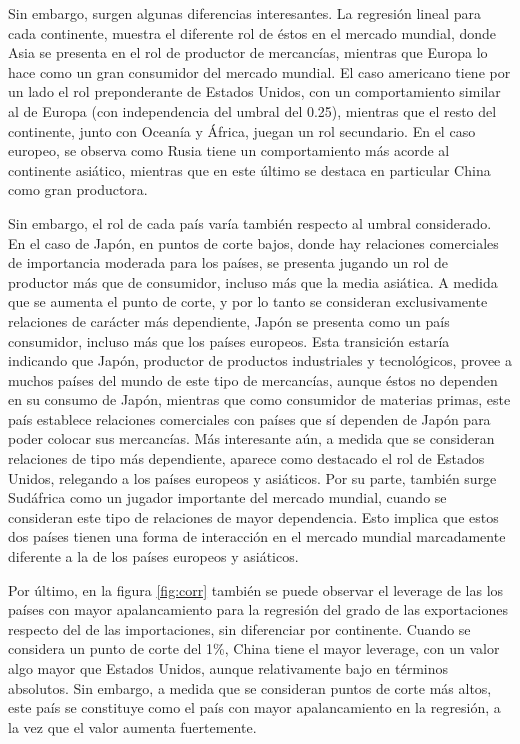 \documentclass[class=article, crop=false]{standalone}
\begin{document}
Sin embargo, surgen algunas diferencias interesantes. La regresión lineal para cada continente, muestra el diferente rol de éstos en el mercado mundial, donde Asia se presenta en el rol de productor de mercancías, mientras que Europa lo hace como un gran consumidor del mercado mundial. El caso americano tiene por un lado el rol preponderante de Estados Unidos, con un comportamiento similar al de Europa (con independencia del umbral del 0.25), mientras que el resto del continente, junto con Oceanía y África, juegan un rol secundario. En el caso europeo, se observa como Rusia tiene un comportamiento más acorde al continente asiático, mientras que en este último se destaca en particular China como gran productora.      

Sin embargo, el rol de cada país varía también respecto al umbral considerado. En el caso de Japón, en puntos de corte bajos, donde hay relaciones comerciales de importancia moderada para los países, se presenta jugando un rol de productor más que de consumidor, incluso más que la media asiática. A medida que se aumenta el punto de corte, y por lo tanto se consideran exclusivamente relaciones de carácter más dependiente, Japón se presenta como un país consumidor, incluso más que los países europeos. Esta transición estaría indicando que Japón, productor de productos industriales y tecnológicos, provee a muchos países del mundo de este tipo de mercancías, aunque éstos no dependen en su consumo de Japón, mientras que como consumidor de materias primas, este país establece relaciones comerciales con países que sí dependen de Japón para poder colocar sus mercancías. Más interesante aún, a medida que se consideran relaciones de tipo más dependiente, aparece como destacado el rol de Estados Unidos, relegando a los países europeos y asiáticos. Por su parte, también surge Sudáfrica como un jugador importante del mercado mundial, cuando se consideran este tipo de relaciones de mayor dependencia. Esto implica que estos dos países tienen una forma de interacción en el mercado mundial marcadamente diferente a la de los países europeos y asiáticos.       

Por último, en la figura \ref{fig:corr} también se puede observar el leverage de las los países con mayor apalancamiento para la regresión del grado de las exportaciones respecto del de las importaciones, sin diferenciar por continente. Cuando se considera un punto de corte del 1\%, China tiene el mayor leverage, con un valor algo mayor que Estados Unidos, aunque relativamente bajo en términos absolutos. Sin embargo, a medida que se consideran puntos de corte más altos, este país se constituye como el país con mayor apalancamiento en la regresión, a la vez que el valor aumenta fuertemente.      
\end{document}
